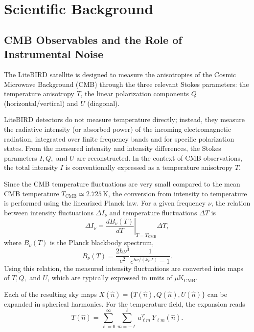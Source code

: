 \chapter{Scientific Background}


\section{CMB Observables and the Role of Instrumental Noise}

The LiteBIRD satellite is designed to measure the anisotropies of the Cosmic Microwave Background (CMB) through the three relevant Stokes parameters: the temperature anisotropy $T$, the linear polarization components $Q$ (horizontal/vertical) and $U$ (diagonal).

LiteBIRD detectors do not measure temperature directly; instead, they measure the radiative intensity (or absorbed power) of the incoming electromagnetic radiation, integrated over finite frequency bands and for specific polarization states. From the measured intensity and intensity differences, the Stokes parameters $I, Q,$ and $U$ are reconstructed. In the context of CMB observations, the total intensity $I$ is conventionally expressed as a temperature anisotropy $T$.

Since the CMB temperature fluctuations are very small compared to the mean CMB temperature $T_{\mathrm{CMB}} \simeq 2.725\,\mathrm{K}$, the conversion from intensity to temperature is performed using the linearized Planck law. For a given frequency $\nu$, the relation between intensity fluctuations $\Delta I_\nu$ and temperature fluctuations $\Delta T$ is
\begin{equation}
\Delta I_\nu =
\left.\frac{dB_\nu(T)}{dT}\right|_{T=T_{\mathrm{CMB}}} \Delta T ,
\end{equation}
where $B_\nu(T)$ is the Planck blackbody spectrum,
\begin{equation}
B_\nu(T) = \frac{2 h \nu^3}{c^2} \frac{1}{e^{h\nu/(k_B T)} - 1}.
\end{equation}
Using this relation, the measured intensity fluctuations are converted into maps of $T, Q,$ and $U$, which are typically expressed in units of $\mu\mathrm{K}_{\mathrm{CMB}}$.

Each of the resulting sky maps $X(\hat{n}) = \{T(\hat{n}), Q(\hat{n}), U(\hat{n})\}$ can be expanded in spherical harmonics. For the temperature field, the expansion reads
\begin{equation}
T(\hat{n}) = \sum_{\ell=0}^{\infty} \sum_{m=-\ell}^{\ell} a^{T}_{\ell m} \, Y_{\ell m}(\hat{n}) .
\end{equation}

